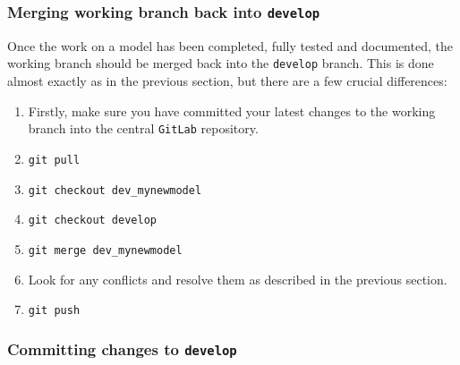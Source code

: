 \subsubsection{Merging working branch back into \texttt{develop}}

Once the work on a model has been completed, fully tested and documented, the
working branch should be merged back into the \texttt{develop} branch. This is
done almost exactly as in the previous section, but there are a few crucial
differences:

\begin{enumerate}

\item Firstly, make sure you have committed your latest changes to the working
  branch into the central \texttt{GitLab} repository.

\item \texttt{git pull}

\item \texttt{git checkout dev\_mynewmodel}

\item \texttt{git checkout develop}

\item \texttt{git merge dev\_mynewmodel}

\item Look for any conflicts and resolve them as described in the previous
  section.

\item \texttt{git push}

\end{enumerate}

\subsubsection{Committing changes to \texttt{develop}}

